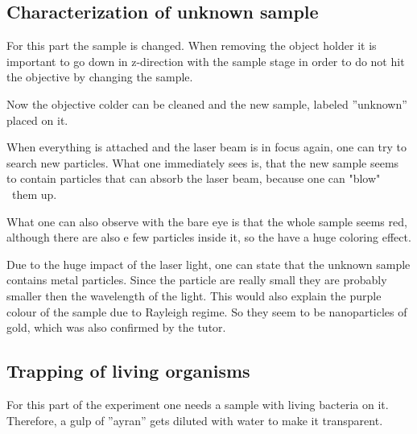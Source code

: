 \documentclass[12pt,english]{scrartcl}
\begin{document}
\subsection{Characterization of unknown sample}


For this part the sample is changed. When removing the object holder it is
important to go down in z-direction with the sample stage in order to do not
hit the objective by changing the sample.

Now the objective colder can be cleaned and the new sample, labeled ''unknown''
placed on it.

When everything is attached and the laser beam is in focus again, one can try
to search new particles. What one immediately sees is, that the new sample
seems to contain particles that can absorb the laser beam, because one can
"blow" \ them up.


What one can also observe with the bare eye is that the whole sample seems red,
although there are also e few particles inside it, so the have a huge coloring
effect.

Due to the huge impact of the laser light, one can state that the unknown sample contains
metal particles. Since the particle are really small
they are probably smaller then the wavelength of the light.
This would also explain the purple colour of the sample due to Rayleigh regime.
So they seem to be nanoparticles of gold, which was also confirmed by the tutor.

\subsection{Trapping of living organisms}

For this part of the experiment one needs a sample with living bacteria on it.
Therefore, a gulp of ''ayran'' gets diluted with water to make it transparent.
\end{document}
